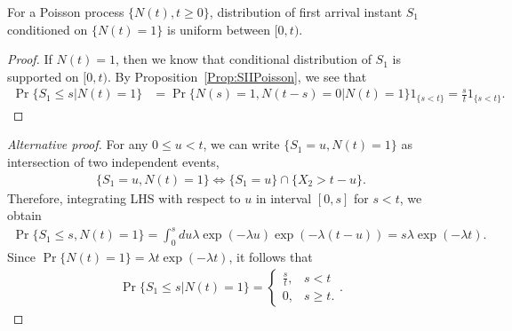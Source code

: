 \documentclass[a4paper,10pt,english]{article}
\begin{document}
\begin{prop} 
For a Poisson process $\{N(t), t\geqslant 0\}$, distribution of first arrival instant $S_1$ conditioned on $\{N(t)=1\}$ is uniform between $[0,t)$.
\end{prop}
\begin{proof} If $N(t) = 1$, then we know that conditional distribution of $S_1$ is supported on $[0,t)$. By Proposition~\ref{Prop:SIIPoisson}, we see that
\begin{align*}
\Pr\{S_1 \leq s | N(t) = 1\} &= \Pr\{ N(s) = 1, N(t-s) = 0 | N(t) = 1\}1_{\{s < t\}} = \frac{s}{t}1_{\{s < t\}}.
\end{align*}
\end{proof}
\begin{proof}[Alternative proof]
For any $0 \leq u < t$, we can write $\{S_1 = u, N(t) = 1\}$ as intersection of two independent events, %
\begin{align*}
\{S_1 = u, N(t) = 1\} \iff \{S_1 = u\}\cap\{X_2 > t - u\}.
\end{align*}
Therefore, integrating LHS with respect to $u$ in interval $[0,s]$ for $s < t$, we obtain
\begin{align*}
\Pr\{S_1 \leq s, N(t) = 1\} = \int_{0}^{s}du \lambda \exp(-\lambda u)\exp(-\lambda (t-u)) = s\lambda\exp(-\lambda t).
\end{align*}
Since $\Pr\{N(t) = 1\} = \lambda t \exp(-\lambda t)$, it follows that 
\begin{align*}
\Pr\{S_1 \leq s| N(t) = 1\} = \begin{cases}\frac{s}{t}, & s < t\\ 0, & s \geq t.\end{cases}.
\end{align*}
\end{proof}
\end{document}
